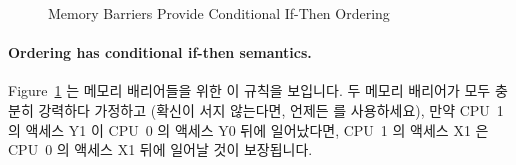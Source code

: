 \begin{figure}[htb]
\centering
{}
\caption{Memory Barriers Provide Conditional If-Then Ordering}
\label{fig:memorder:Memory Barriers Provide Conditional If-Then Ordering}
\end{figure}

\paragraph{Ordering has conditional if-then semantics.}
Figure~\ref{fig:memorder:Memory Barriers Provide Conditional If-Then Ordering}
는 메모리 배리어들을 위한 이 규칙을 보입니다.
두 메모리 배리어가 모두 충분히 강력하다 가정하고 (확신이 서지 않는다면, 언제든
 를 사용하세요), 만약 CPU~1 의 액세스 Y1 이 CPU~0 의 액세스 Y0
뒤에 일어났다면, CPU~1 의 액세스 X1 은 CPU~0 의 액세스 X1 뒤에 일어날 것이
보장됩니다.

